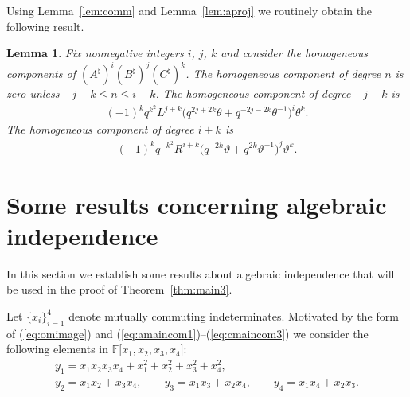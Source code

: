 \documentclass[11pt]{article}
\numberwithin{equation}{section}
\newtheorem{Lemma}[Theorem]{Lemma}
\begin{document}
Using Lemma~\ref{lem:comm}
and Lemma~\ref{lem:aproj} we routinely obtain the following result.


\begin{Lemma}
\label{lem:threeproj}
Fix nonnegative integers $i$, $j$, $k$
and consider the homogeneous components of
$(A^\natural)^i(B^\natural)^j(C^\natural)^k$.
The homogeneous component of degree $n$ is zero unless
$-j-k\leq n \leq i+k$.
The homogeneous component of degree $-j-k$ is
\begin{gather*}
(-1)^k q^{k^2}
L^{j+k}
\big(
q^{2j+2k} \theta
+
q^{-2j-2k} \theta^{-1}
\big)^i
\theta^k.
\end{gather*}
The homogeneous component of degree $i+k$ is
\begin{gather*}
(-1)^k q^{-k^2}
R^{i+k}
\big(
q^{-2k}\vartheta +
q^{2k} \vartheta^{-1}
\big)^j
\vartheta^k.
\end{gather*}
\end{Lemma}

\section{Some results concerning algebraic independence}\label{section8}

In this section we establish some results about
algebraic independence that will be used in the proof of
Theorem~\ref{thm:main3}.


Let $\lbrace x_i\rbrace_{i=1}^4$ denote mutually
commuting indeterminates.
Motivated by the form of
(\ref{eq:omimage}) and
(\ref{eq:amaincom1})--(\ref{eq:cmaincom3}) we consider
the following
elements  in
$\mathbb F\lbrack x_1, x_2, x_3, x_4\rbrack$:
\begin{gather}
 y_1 =
x_1x_2x_3x_4
+x_1^2+x_2^2+x_3^2+x_4^2,
\label{eq:y1def}
\\
y_2 = x_1x_2+x_3x_4,
\qquad
y_3 = x_1x_3+x_2x_4,
\qquad
y_4 = x_1x_4+x_2x_3.
\label{eq:y234def}
\end{gather}
\end{document}

